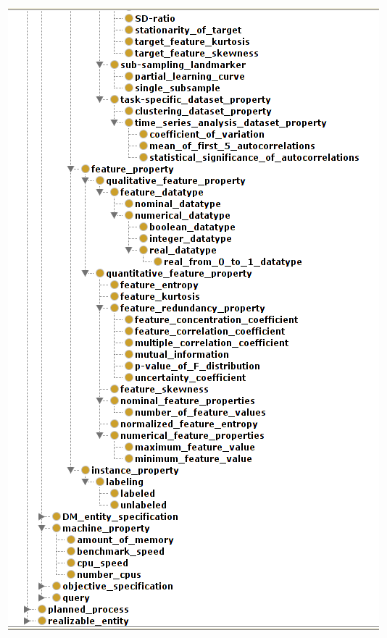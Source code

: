 \documentclass[a4paper,12pt, english]{article}
\begin{document}
\begin{figure}[h]   
  \centering 
  \includegraphics[width=0.875\textwidth]{figs/expose2-4}
  \caption{}
  \label{fig:expose2-4}
\end{figure}
\end{document}
